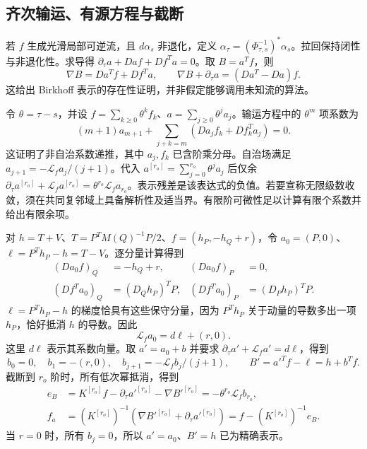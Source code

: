 \subsection{齐次输运、有源方程与截断}
若 $f$ 生成光滑局部可逆流，且 $d\alpha_s$ 非退化，定义 $\alpha_\tau=(\Phi_{\tau,s}^{-1})^*\alpha_s$。拉回保持闭性与非退化性。求导得 $\partial_\tau a+Da f+Df^Ta=0$。取 $B=a^Tf$，则
\begin{equation}
 \nabla B=Da^Tf+Df^Ta,
 \qquad \nabla B+\partial_\tau a=(Da^T-Da)f.
 \label{eq:sup-transport-representation}
\end{equation}
这给出 Birkhoff 表示的存在性证明，并非假定能够调用未知流的算法。

令 $\theta=\tau-s$，并设 $f=\sum_{k\ge0}\theta^kf_k$、$a=\sum_{j\ge0}\theta^ja_j$。输运方程中的 $\theta^m$ 项系数为
\begin{equation}
 (m+1)a_{m+1}+\sum_{j+k=m}(Da_jf_k+Df_k^Ta_j)=0.
 \label{eq:sup-general-transport}
\end{equation}
这证明了非自治系数递推，其中 $a_j,f_k$ 已含阶乘分母。自治场满足 $a_{j+1}=-\mathcal L_fa_j/(j+1)$。代入 $a^{[r_o]}=\sum_{j=0}^{r_o}\theta^ja_j$ 后仅余
$\partial_\tau a^{[r_o]}+\mathcal L_fa^{[r_o]}=\theta^{r_o}\mathcal L_fa_{r_o}$。表示残差是该表达式的负值。若要宣称无限级数收敛，须在共同复邻域上具备解析性及适当界。有限阶可微性足以计算有限个系数并给出有限余项。

对 $h=T+V$、$T=P^TM(Q)^{-1}P/2$、$f=(h_P,-h_Q+r)$，令 $a_0=(P,0)$、$\ell=P^Th_P-h=T-V$。逐分量计算得到
\begin{align}
 (Da_0 f)_Q&=-h_Q+r,&(Da_0 f)_P&=0,\\
 (Df^Ta_0)_Q&=(D_Qh_P)^TP,&(Df^Ta_0)_P&=(D_Ph_P)^TP.
\end{align}
$\ell=P^Th_P-h$ 的梯度恰具有这些保守分量，因为 $P^Th_P$ 关于动量的导数多出一项 $h_P$，恰好抵消 $h$ 的导数。因此
\begin{equation}
 \mathcal L_fa_0=d\ell+(r,0).
 \label{eq:sup-source-identity}
\end{equation}
这里 $d\ell$ 表示其系数向量。取 $a'=a_0+b$ 并要求 $\partial_\tau a'+\mathcal L_fa'=d\ell$，得到
\begin{equation}
 b_0=0,\quad b_1=-(r,0),\quad b_{j+1}=-\mathcal L_fb_j/(j+1),
 \qquad B'=a'^Tf-\ell=h+b^Tf.
 \label{eq:sup-source-series}
\end{equation}
截断到 $r_o$ 阶时，所有低次幂抵消，得到
\begin{align}
 e_B&=K^{[r_o]}f-\partial_\tau a'^{[r_o]}-\nabla B'^{[r_o]}
       =-\theta^{r_o}\mathcal L_fb_{r_o},\\
 f_a&=(K^{[r_o]})^{-1}(\nabla B'^{[r_o]}+\partial_\tau a'^{[r_o]})
       =f-(K^{[r_o]})^{-1}e_B.
 \label{eq:sup-source-remainder}
\end{align}
当 $r=0$ 时，所有 $b_j=0$，所以 $a'=a_0$、$B'=h$ 已为精确表示。


